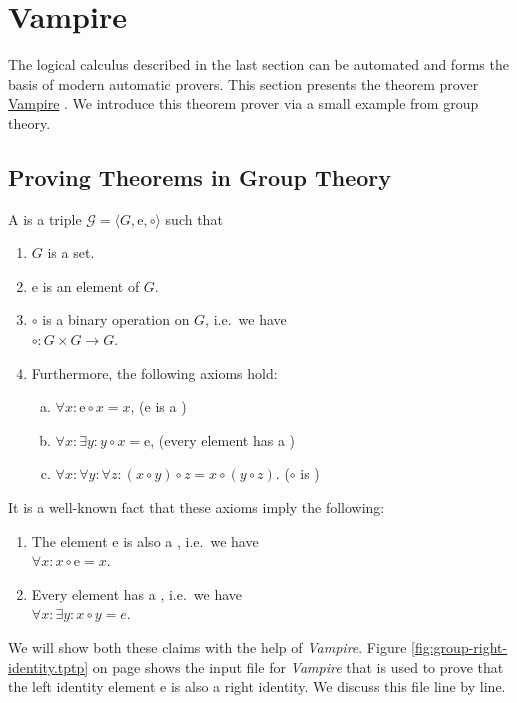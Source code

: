 \section{Vampire }
The logical calculus described in the last section can be automated and forms the basis of modern
automatic provers.  This section presents the theorem prover \href{https://vprover.github.io}{Vampire}
\cite{kovacs:2013}.  We introduce this theorem prover via a small example from group theory.

\subsection{Proving Theorems in Group Theory}
A  is a triple $\mathcal{G} = \langle G, \mathrm{e}, \circ \rangle$
such that
\begin{enumerate}
\item $G$ is a set.
\item $\mathrm{e}$ is an element of $G$.
\item $\circ$ is a binary operation on $G$, i.e.~we have
      \\[0.2cm]
      \hspace*{1.3cm}
      $\circ: G \times G \rightarrow G$.
\item Furthermore, the following axioms hold:
      \begin{enumerate}[(a)]
      \item $\forall x: \mathrm{e} \circ x = x$, \hspace*{\fill} ($\mathrm{e}$ is a )
      \item $\forall x: \exists y: y \circ x = \mathrm{e}$, \hspace*{\fill} (every element has a ) 
      \item $\forall x: \forall y: \forall z: (x \circ y) \circ z = x \circ (y \circ z)$. \hspace*{\fill} ($\circ$ is )
      \end{enumerate}
\end{enumerate}
It is a well-known fact that these axioms imply the following:
\begin{enumerate}
\item The element $\mathrm{e}$ is also a , i.e.~we have
      \\[0.2cm]
      \hspace*{1.3cm}
      $\forall x: x \circ \mathrm{e} = x$.
\item Every element has a , i.e.~we have
      \\[0.2cm]
      \hspace*{1.3cm}
      $\forall x: \exists y: x \circ y = e$.
\end{enumerate}
We will show both these claims with the help of \textsl{Vampire}.  Figure \ref{fig:group-right-identity.tptp} on page
\pageref{fig:group-right-identity.tptp} shows the input file for \textsl{Vampire} that is used to prove that
the left identity element $\mathrm{e}$ is also a right identity.  We discuss this file line by line.

